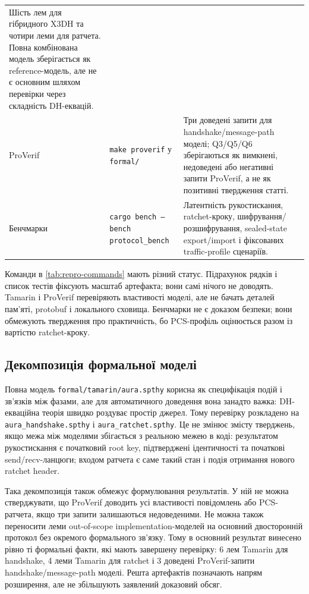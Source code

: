 \documentclass[11pt,a4paper]{article}
\theoremstyle{definition}
\begin{document}
\begin{table}[tbp]
\begin{tabularx}{\textwidth}{@{}p{}YY@{}}
Шість лем для гібридного X3DH та чотири леми для ратчета. Повна
комбінована модель зберігається як reference-модель, але не є
основним шляхом перевірки через складність DH-еквацій. \\
\addlinespace
ProVerif &
\texttt{make proverif} у \texttt{formal/} &
Три доведені запити для handshake/message-path моделі; Q3/Q5/Q6 зберігаються
як вимкнені, недоведені або негативні запити ProVerif, а не як позитивні
твердження статті. \\
\addlinespace
Бенчмарки &
\texttt{cargo bench --bench protocol\_bench} &
Латентність рукостискання, ratchet-кроку, шифрування/розшифрування,
sealed-state export/import і фіксованих traffic-profile сценаріїв. \\
\bottomrule
\end{tabularx}
\end{table}

Команди в \cref{tab:repro-commands} мають різний статус. Підрахунок
рядків і список тестів фіксують масштаб артефакта; вони самі нічого не
доводять. Tamarin і ProVerif перевіряють властивості моделі, але не
бачать деталей пам'яті, protobuf і локального сховища. Бенчмарки не є доказом
безпеки; вони обмежують твердження про практичність, бо PCS-профіль
оцінюється разом із вартістю ratchet-кроку.

\subsection{Декомпозиція формальної моделі}

Повна модель \texttt{formal/tamarin/aura.spthy} корисна як специфікація
подій і зв'язків між фазами, але для автоматичного доведення вона
занадто важка: DH-екваційна теорія швидко роздуває простір джерел.
Тому перевірку розкладено на \texttt{aura\_handshake.spthy} і
\texttt{aura\_ratchet.spthy}. Це не змінює змісту тверджень, якщо
межа між моделями збігається з реальною межею в коді: результатом
рукостискання є початковий root key, підтверджені ідентичності та
початкові send/recv-ланцюги; входом ратчета є саме такий стан і подія
отримання нового ratchet header.

Така декомпозиція також обмежує формулювання результатів. У ній не можна
стверджувати, що ProVerif доводить усі властивості повідомлень або
PCS-ратчета, якщо три запити залишаються недоведеними. Не можна також переносити леми
out-of-scope implementation-моделей на основний двосторонній протокол без окремого формального
зв'язку. Тому в основний результат винесено рівно ті формальні факти,
які мають завершену перевірку: 6 лем Tamarin для handshake, 4 леми
Tamarin для ratchet і 3 доведені ProVerif-запити handshake/message-path
моделі. Решта артефактів
позначають напрям розширення, але не збільшують заявлений доказовий
обсяг.
\end{document}
